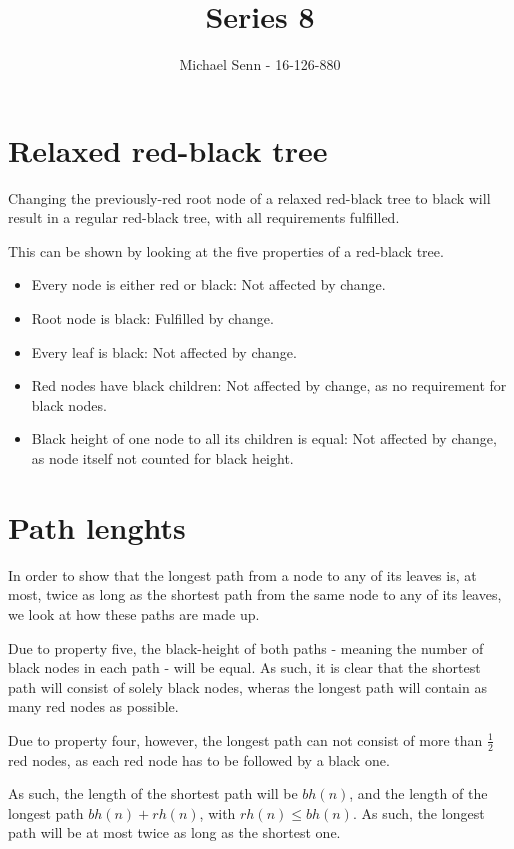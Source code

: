 \documentclass[a4paper]{scrartcl}
\title{Series 8}
\author{Michael Senn - 16-126-880}
\date{}
\begin{document}
\maketitle

\section{Relaxed red-black tree}

Changing the previously-red root node of a relaxed red-black tree to black will
result in a regular red-black tree, with all requirements fulfilled.

This can be shown by looking at the five properties of a red-black tree.

\begin{itemize}
	\item Every node is either red or black: Not affected by change.
	\item Root node is black: Fulfilled by change.
	\item Every leaf is black: Not affected by change.
	\item Red nodes have black children: Not affected by change, as no requirement for black nodes.
	\item Black height of one node to all its children is equal: Not affected by change, as node itself not counted for black height.
\end{itemize}


\section{Path lenghts}

In order to show that the longest path from a node to any of its leaves is, at
most, twice as long as the shortest path from the same node to any of its
leaves, we look at how these paths are made up.

Due to property five, the black-height of both paths - meaning the number of
black nodes in each path - will be equal. As such, it is clear that the
shortest path will consist of solely black nodes, wheras the longest path will
contain as many red nodes as possible.

Due to property four, however, the longest path can not consist of more than
$\frac{1}{2}$ red nodes, as each red node has to be followed by a black one.

As such, the length of the shortest path will be $bh(n)$, and the length of the
longest path $bh(n) + rh(n)$, with $rh(n) \leq bh(n)$. As such, the longest
path will be at most twice as long as the shortest one.
\end{document}
